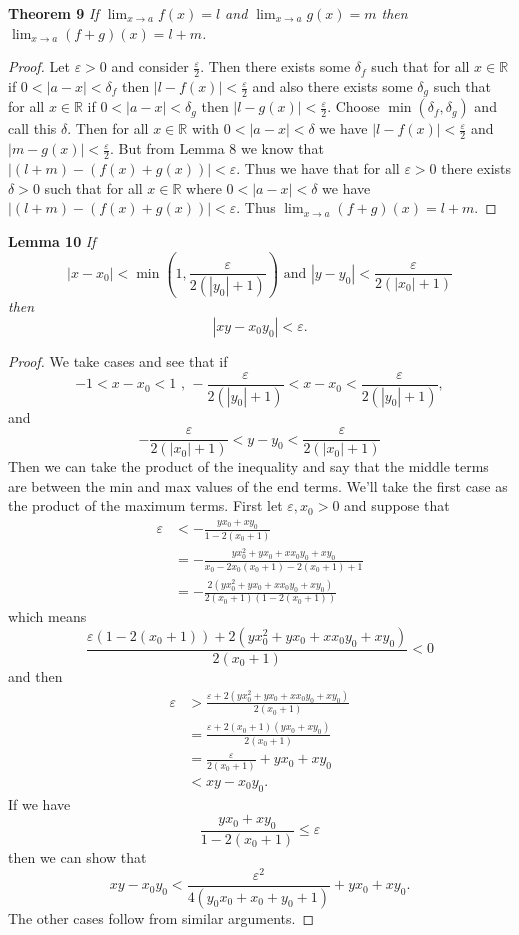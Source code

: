 \documentclass{article}
\begin{document}
\begin{flushleft}
\textbf{Theorem 9}
\textsl{If $\lim_{x \rightarrow a} f(x) = l$ and $\lim_{x \rightarrow a} g(x) = m$ then $\lim_{x \rightarrow a} (f+g)(x) = l+m$.}
\begin{proof}
Let $\varepsilon > 0$ and consider $\frac{\varepsilon}{2}$. Then there exists some $\delta_f$ such that for all $x \in \mathbb{R}$ if $0 < |a - x| < \delta_f$ then $|l - f(x)| < \frac{\varepsilon}{2}$ and also there exists some $\delta_g$ such that for all $x \in \mathbb{R}$ if $0 < |a - x| < \delta_g$ then $|l - g(x)| < \frac{\varepsilon}{2}$. Choose $\min (\delta_f, \delta_g)$ and call this $\delta$. Then for all $x \in \mathbb{R}$ with $0 < |a-x| < \delta$ we have $|l - f(x)| < \frac{\varepsilon}{2}$ and $|m - g(x)| < \frac{\varepsilon}{2}$. But from Lemma 8 we know that $|(l+m)-(f(x)+g(x))| < \varepsilon$. Thus we have that for all $\varepsilon > 0$ there exists $\delta > 0$ such that for all $x \in \mathbb{R}$ where $0 < |a-x| < \delta$ we have $|(l+m)-(f(x)+g(x))| < \varepsilon$. Thus $\lim_{x \rightarrow a} (f+g)(x) = l+m$.
\end{proof}

\textbf{Lemma 10}
\textsl{If
\[
|x-x_0| < \min \left(1, \frac{\varepsilon}{2 (|y_0| + 1)} \right) \text{ and } |y-y_0| < \frac{\varepsilon}{2 (|x_0| + 1)}
\]
then
\[
|xy-x_0y_0| < \varepsilon.
\]}
\begin{proof}
We take cases and see that if
\[
-1 < x-x_0 < 1 \text{ , } -\frac{\varepsilon}{2 (|y_0| + 1)} < x-x_0 < \frac{\varepsilon}{2 (|y_0| + 1)},
\]
and
\[
-\frac{\varepsilon}{2 (|x_0| + 1)} < y-y_0 < \frac{\varepsilon}{2 (|x_0| + 1)}
\]
Then we can take the product of the inequality and say that the middle terms are between the min and max values of the end terms. We'll take the first case as the product of the maximum terms. First let $\varepsilon, x_0 > 0$ and suppose that
\begin{align*}
\varepsilon & < -\frac{yx_0 + xy_0}{1-2(x_0 + 1)} \\
		  & = -\frac{yx_0^2 + yx_0 + xx_0y_0 + xy_0}{x_0-2x_0(x_0+1) - 2(x_0+1) + 1} \\
		  & = -\frac{2(yx_0^2+yx_0+xx_0y_0+xy_0)}{2(x_0+1)(1-2(x_0+1))}
\end{align*}
which means
\[
\frac{\varepsilon (1-2(x_0+1)) + 2(yx_0^2 + yx_0 + xx_0y_0 + xy_0)}{2(x_0+1)} < 0
\]
and then
\begin{align*}
\varepsilon & > \frac{\varepsilon + 2(yx_0^2 + yx_0 + xx_0y_0 + xy_0)}{2(x_0+1)} \\
		  & = \frac{\varepsilon + 2(x_0 + 1)(yx_0+xy_0)}{2(x_0+1)} \\
		  & = \frac{\varepsilon}{2(x_0+1)} + yx_0 + xy_0 \\
		  & < xy - x_0y_0.
\end{align*}
If we have
\[
\frac{yx_0+xy_0}{1-2(x_0+1)} \leq \varepsilon
\]
then we can show that
\[
xy - x_0y_0 < \frac{\varepsilon^2}{4(y_0x_0 + x_0 + y_0 + 1)} + yx_0 + xy_0.
\]
The other cases follow from similar arguments.
\end{proof}


\end{flushleft}
\end{document}

